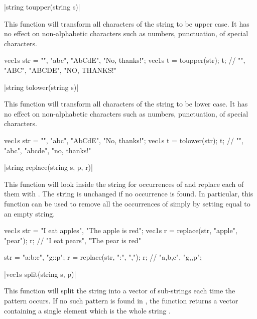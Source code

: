 \funcitem \vectorfunc \cppinline|string toupper(string s)| 

This function will transform all characters of the string to be upper case. It has no effect on non-alphabetic characters such as numbers, punctuation, of special characters.

\begin{example}
\begin{cppcode}
vec1s str = {"", "abc", "AbCdE", "No, thanks!"};
vec1s t = toupper(str);
t; // {"", "ABC", "ABCDE", "NO, THANKS!"}
\end{cppcode}
\end{example}

\funcitem \vectorfunc \cppinline|string tolower(string s)| 

This function will transform all characters of the string to be lower case. It has no effect on non-alphabetic characters such as numbers, punctuation, of special characters.

\begin{example}
\begin{cppcode}
vec1s str = {"", "abc", "AbCdE", "No, thanks!"};
vec1s t = tolower(str);
t; // {"", "abc", "abcde", "no, thanks!"}
\end{cppcode}
\end{example}

\funcitem \vectorfunc \cppinline|string replace(string s, p, r)| 

This function will look inside the string  for occurrences of  and replace each of them with . The string is unchanged if no occurrence is found. In particular, this function can be used to remove all the occurrences of  simply by setting  equal to an empty string.

\begin{example}
\begin{cppcode}
vec1s str = {"I eat apples", "The apple is red"};
vec1s r = replace(str, "apple", "pear");
r; // {"I eat pears", "The pear is red"}

str = {"a:b:c", "g::p"};
r = replace(str, ":", ",");
r; // {"a,b,c", "g,,p"};
\end{cppcode}
\end{example}

\funcitem \cppinline|vec1s split(string s, p)| 

This function will split the string  into a vector of sub-strings each time the pattern  occurs. If no such pattern is found in , the function returns a vector containing a single element which is the whole string .

